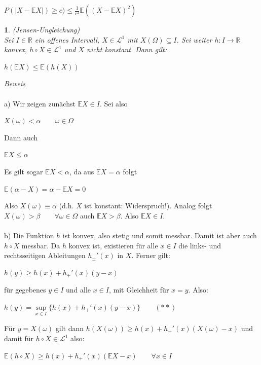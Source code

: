 \documentclass[10pt,a4paper]{report}
\numberwithin{equation}{section}
\numberwithin{figure}{section}
\theoremstyle{plain}
\theoremstyle{definition}
\theoremstyle{plain}
\newtheorem{prop}{\protect\propositionname}[section]
\theoremstyle{definition}
\theoremstyle{remark}
\theoremstyle{plain}
\theoremstyle{plain}
\theoremstyle{plain}
\theoremstyle{plain}
\theoremstyle{plain}
\providecommand{\propositionname}{Satz}
\newcommand{\1}{ \mathbb{1} } %
\begin{document}
\begin{center}
$P(|X-\mathbb{E}X|)\geq c) \leq \frac{1}{c^2}\mathbb{E}((X-\mathbb{E}X)^2)$
\end{center}
\begin{prop}  (Jensen-Ungleichung)\\
  Sei $I\in \mathbb{R}$ ein offenes Intervall, $X \in \mathcal{L}^1$
  mit $X(\Omega)\subseteq I$. Sei weiter $h:I\to\mathbb{R}$ konvex,
  $h\circ X \in \mathcal{L}^1$ und $X$ nicht konstant. Dann gilt:
  \begin{center}
    $h(\mathbb{E}X)\leq \mathbb{E}(h(X))$
  \end{center}
\end{prop}
\textit{Beweis}\\\\
a) Wir zeigen zunächst $\mathbb{E}X \in I$. Sei also
\begin{center}
$X(\omega)< \alpha \qquad \omega \in \Omega$
\end{center}
Dann auch
\begin{center}
$\mathbb{E}X\leq \alpha$
\end{center}
Es gilt sogar $\mathbb{E}X < \alpha$, da aus $\mathbb{E}X=\alpha$ folgt 
\begin{center}
$\mathbb{E}(\alpha-X)=\alpha-\mathbb{E}X=0$
\end{center}
Also $X(\omega)\equiv \alpha$ (d.h. $X$ ist konstant: Widerspruch!). Analog folgt $X(\omega)>\beta \qquad \forall \omega \in \Omega$ auch $\mathbb{E}X> \beta$. Also $\mathbb{E}X \in I$.\\\\
b) Die Funktion $h$ ist konvex, also stetig und somit messbar. Damit ist aber auch $h\circ X$ messbar. Da $h$ konvex ist, existieren für alle $x \in I$ die links- und rechtsseitigen Ableitungen $h_\pm'(x)$ in $X$. Ferner gilt:
\begin{center}
$h(y)\geq h(x)+h_+'(x)(y-x)$
\end{center}
für gegebenes $y \in I$ und alle $x \in I$, mit Gleichheit für $x=y$. Also:
\begin{center}
$h(y)=\sup\limits_{x \in I}\{h(x)+h_+'(x)(y-x)\} \qquad (**)$
\end{center} 
Für $y=X(\omega)$ gilt dann $h(X(\omega))\geq h(x)+h_+'(x)(X(\omega)-x)$ und damit für $h\circ X \in \mathcal{L}^1$ also:\\
\begin{center}
$\mathbb{E}(h\circ X) \geq h(x)+h_+'(x)(\mathbb{E}X-x) \qquad \forall x \in I$
\end{center}
\end{document}
